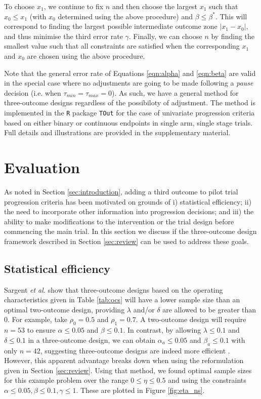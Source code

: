 \documentclass{bmcart}
\begin{document}
To choose $x_1$, we continue to fix $n$ and then choose the largest $x_1$ such that $x_0 \leq x_1$ (with $x_0$ determined using the above procedure) and $\beta \leq \beta^*$. This will correspond to finding the largest possible intermediate outcome zone $|x_1 - x_0|$, and thus minimise the third error rate $\gamma$. Finally, we can choose $n$ by finding the smallest value such that all constraints are satisfied when the corresponding $x_1$ and $x_0$ are chosen using the above procedure.

Note that the general error rate of Equations \ref{eqn:alpha} and \ref{eqn:beta} are valid in the special case where no adjustments are going to be made following a \emph{pause} decision (i.e. when $\tau_{min} = \tau_{max} = 0$). As such, we have a general method for three-outcome designs regardless of the possibiloty of adjustment. The method is implemented in the \texttt{R} package \texttt{TOut} for the case of univariate progression criteria based on either binary or continuous endpoints in single arm, single stage trials. Full details and illustrations are provided in the supplementary material.

\section{Evaluation}\label{sec:methods}

As noted in Section \ref{sec:introduction}, adding a third outcome to pilot trial progression criteria has been motivated on grounds of i) statistical efficiency; ii) the need to incorporate other information into progression decisions; and iii) the ability to make modifications to the intervention or the trial design before commencing the main trial. In this section we discuss if the three-outcome design framework described in Section \ref{sec:review} can be used to address these goals.

\subsection{Statistical efficiency}\label{sec:efficiency}

Sargent \emph{et al.} show that three-outcome designs based on the operating characteristics given in Table \ref{tab:ocs} will have a lower sample size than an optimal two-outcome design, providing $\lambda$ and/or $\delta$ are allowed to be greater than 0. For example, take $\rho_0 = 0.5$ and $\rho_1 = 0.7$. A two-outcome design will require $n = 53$ to ensure $\alpha \leq 0.05$ and $\beta \leq 0.1$. In contrast, by allowing $\lambda \leq 0.1$ and $\delta \leq 0.1$ in a three-outcome design, we can obtain $\alpha_a \leq 0.05$ and $\beta_a \leq 0.1$ with only $n = 42$, suggesting three-outcome designs are indeed more efficient \cite{Sargent2001, Hong2007}. However, this apparent advantage breaks down when using the reformulation given in Section \ref{sec:review}. Using that method, we found optimal sample sizes for this example problem over the range $0 \leq \eta \leq 0.5$ and using the constraints $\alpha \leq 0.05, \beta \leq 0.1, \gamma \leq 1$. These are plotted in Figure \ref{fig:eta_ns}.
\end{document}
